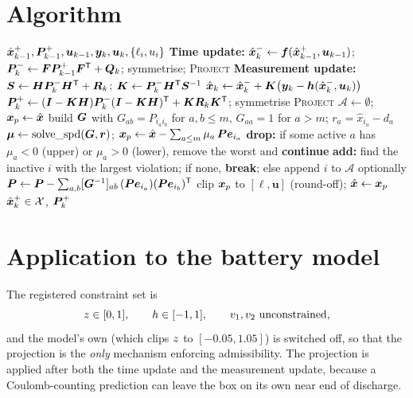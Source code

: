 \section{Algorithm}
\begin{algorithm}[H]
\caption{Constrained-EKF --- one sampling period}
\begin{algorithmic}[1]
\Require $\hat{\bm{x}}^{+}_{k-1},\bm{P}^{+}_{k-1},\bm{u}_{k-1},\bm{y}_k,\bm{u}_k,\{\ell_i,u_i\}$
\State \textbf{Time update:} $\hat{\bm{x}}^{-}_k\gets\bm{f}(\hat{\bm{x}}^{+}_{k-1},\bm{u}_{k-1})$;\;
  $\bm{P}^{-}_k\gets\bm{F}\bm{P}^{+}_{k-1}\bm{F}^{\mathsf{T}}+\bm{Q}_k$; symmetrise; \textsc{Project}
\State \textbf{Measurement update:} $\bm{S}\gets\bm{H}\bm{P}^{-}_k\bm{H}^{\mathsf{T}}+\bm{R}_k$;\;
  $\bm{K}\gets\bm{P}^{-}_k\bm{H}^{\mathsf{T}}\bm{S}^{-1}$
\State $\hat{\bm{x}}_k\gets\hat{\bm{x}}^{-}_k+\bm{K}\big(\bm{y}_k-\bm{h}(\hat{\bm{x}}^{-}_k,\bm{u}_k)\big)$
\State $\bm{P}^{+}_k\gets(\bm{I}-\bm{K}\bm{H})\bm{P}^{-}_k(\bm{I}-\bm{K}\bm{H})^{\mathsf{T}}+\bm{K}\bm{R}_k\bm{K}^{\mathsf{T}}$; symmetrise
\State \textsc{Project}
\Statex
{}
  \State $\mathcal{A}\gets\emptyset$;\; $\bm{x}_p\gets\hat{\bm{x}}$
    \State build $\bm{G}$ with $G_{ab}=P_{i_a i_b}$ for $a,b\le m$, $G_{aa}=1$ for $a>m$;\;
           $r_a=\hat{x}_{i_a}-d_a$
    \State $\bm\mu\gets\operatorname{solve\_spd}(\bm{G},\bm{r})$;\quad
           $\bm{x}_p\gets\hat{\bm{x}}-\sum_{a\le m}\mu_a\,\bm{P}\bm{e}_{i_a}$
    \State \textbf{drop:} if some active $a$ has $\mu_a<0$ (upper) or $\mu_a>0$ (lower),
           remove the worst and \textbf{continue}
    \State \textbf{add:} find the inactive $i$ with the largest violation; if none, \textbf{break};
           else append $i$ to $\mathcal{A}$
  \EndFor
  \State optionally $\bm{P}\gets\bm{P}-\sum_{a,b}[\bm{G}^{-1}]_{ab}\,(\bm{P}\bm{e}_{i_a})(\bm{P}\bm{e}_{i_b})^{\mathsf{T}}$
  \State clip $\bm{x}_p$ to $[\bm\ell,\bm u]$ (round-off);\; $\hat{\bm{x}}\gets\bm{x}_p$
\EndProcedure
\Ensure $\hat{\bm{x}}^{+}_k\in\mathcal{X}$, $\bm{P}^{+}_k$
\end{algorithmic}
\end{algorithm}

\section{Application to the battery model}
The registered constraint set is
\begin{equation}
\soc\in[0,1],\qquad h\in[-1,1],\qquad v_1,v_2\ \text{unconstrained},
\label{eq:ce-batt}
\end{equation}
and the model's own  (which clips $z$ to $[-0.05,1.05]$) is switched off, so
that the projection is the \emph{only} mechanism enforcing admissibility.  The projection is
applied after both the time update and the measurement update, because a Coulomb-counting
prediction can leave the box on its own near end of discharge.

